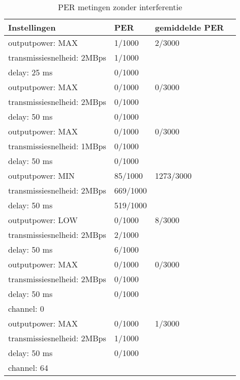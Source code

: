 \documentclass{article}
\begin{document}
\begin{table}[h]
\centering \caption{PER metingen zonder interferentie}
\label{table:interferentieloos}
    \begin{tabular}{ | l | l | l | p{5cm} |}
    \hline
    Instellingen 				& PER 		& gemiddelde PER\\ \hline
    outputpower: MAX 			& 1/1000 	& 2/3000		\\
    transmissiesnelheid: 2MBps 	& 1/1000 	& 				\\
    delay: 25 ms 				& 0/1000	&  				\\ \hline

    outputpower: MAX 			& 0/1000 	& 0/3000		\\
    transmissiesnelheid: 2MBps 	& 0/1000 	&  				\\
    delay: 50 ms 				& 0/1000	&  				\\ \hline
   
    outputpower: MAX 			& 0/1000 	& 0/3000		\\
    transmissiesnelheid: 1MBps 	& 0/1000 	&  				\\
    delay: 50 ms 				& 0/1000	&  				\\ \hline
   
    outputpower: MIN 			& 85/1000 	& 1273/3000		\\ 
    transmissiesnelheid: 2MBps 	& 669/1000  &  				\\ 
    delay: 50 ms 				& 519/1000 	&  				\\ \hline
   
    outputpower: LOW 			& 0/1000 	& 8/3000		\\ 
    transmissiesnelheid: 2MBps 	& 2/1000 	&   			\\ 
    delay: 50 ms 				& 6/1000 	&  				\\ \hline
 
    outputpower: MAX 			& 0/1000 	&  0/3000		\\ 
    transmissiesnelheid: 2MBps 	& 0/1000 	&   			\\ 
    delay: 50 ms 				& 0/1000 	&				\\ 
    channel: 0 					&  			&  				\\ \hline
  
    outputpower: MAX 			& 0/1000 	& 1/3000		\\ 
    transmissiesnelheid: 2MBps 	& 1/1000 	&  				\\ 
    delay: 50 ms 				& 0/1000 	&  				\\ 
    channel: 64 				&  			&				\\ \hline
\end{tabular}
\end{table}
    
\end{document}
